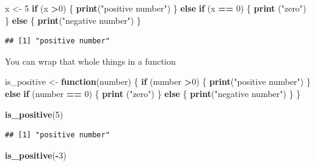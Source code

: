 \documentclass[]{book}
\newenvironment{Shaded}{\begin{snugshade}}{\end{snugshade}}
\newcommand{\ControlFlowTok}[1]{\textcolor[rgb]{0.13,0.29,0.53}{\textbf{#1}}}
\newcommand{\DecValTok}[1]{\textcolor[rgb]{0.00,0.00,0.81}{#1}}
\newcommand{\KeywordTok}[1]{\textcolor[rgb]{0.13,0.29,0.53}{\textbf{#1}}}
\newcommand{\NormalTok}[1]{#1}
\newcommand{\OperatorTok}[1]{\textcolor[rgb]{0.81,0.36,0.00}{\textbf{#1}}}
\newcommand{\StringTok}[1]{\textcolor[rgb]{0.31,0.60,0.02}{#1}}
\theoremstyle{definition}
\theoremstyle{definition}
\theoremstyle{definition}
\theoremstyle{remark}
\begin{document}
\begin{Shaded}
\begin{Highlighting}[]
\begin{Shaded}
\begin{Highlighting}[]
\begin{Shaded}
\begin{Highlighting}[]
\begin{Shaded}
\begin{Highlighting}[]
\NormalTok{x <-}\StringTok{ }\DecValTok{5}
\ControlFlowTok{if}\NormalTok{ (x }\OperatorTok{>}\DecValTok{0}\NormalTok{) \{}
  \KeywordTok{print}\NormalTok{(}\StringTok{"positive number"}\NormalTok{)}
\NormalTok{\} }\ControlFlowTok{else} \ControlFlowTok{if}\NormalTok{ (x }\OperatorTok{==}\StringTok{ }\DecValTok{0}\NormalTok{)  \{}
  \KeywordTok{print}\NormalTok{ (}\StringTok{"zero"}\NormalTok{)}
\NormalTok{\} }\ControlFlowTok{else}\NormalTok{ \{}
  \KeywordTok{print}\NormalTok{(}\StringTok{"negative number"}\NormalTok{)}
\NormalTok{\}}
\end{Highlighting}
\end{Shaded}

\begin{verbatim}
## [1] "positive number"
\end{verbatim}

You can wrap that whole things in a function

\begin{Shaded}
\begin{Highlighting}[]
\NormalTok{is_positive <-}\StringTok{ }\ControlFlowTok{function}\NormalTok{(number) \{}
  \ControlFlowTok{if}\NormalTok{ (number }\OperatorTok{>}\DecValTok{0}\NormalTok{) \{}
    \KeywordTok{print}\NormalTok{(}\StringTok{"positive number"}\NormalTok{)}
\NormalTok{  \} }\ControlFlowTok{else} \ControlFlowTok{if}\NormalTok{ (number }\OperatorTok{==}\StringTok{ }\DecValTok{0}\NormalTok{)  \{}
    \KeywordTok{print}\NormalTok{ (}\StringTok{"zero"}\NormalTok{)}
\NormalTok{  \} }\ControlFlowTok{else}\NormalTok{ \{}
    \KeywordTok{print}\NormalTok{(}\StringTok{"negative number"}\NormalTok{)}
\NormalTok{  \}}
\NormalTok{\}}

\KeywordTok{is_positive}\NormalTok{(}\DecValTok{5}\NormalTok{)}
\end{Highlighting}
\end{Shaded}

\begin{verbatim}
## [1] "positive number"
\end{verbatim}

\begin{Shaded}
\begin{Highlighting}[]
\KeywordTok{is_positive}\NormalTok{(}\OperatorTok{-}\DecValTok{3}\NormalTok{)}
\end{Highlighting}
\end{Shaded}


\end{Highlighting}
\end{Shaded}
\end{Highlighting}
\end{Shaded}
\end{Highlighting}
\end{Shaded}
\end{document}
